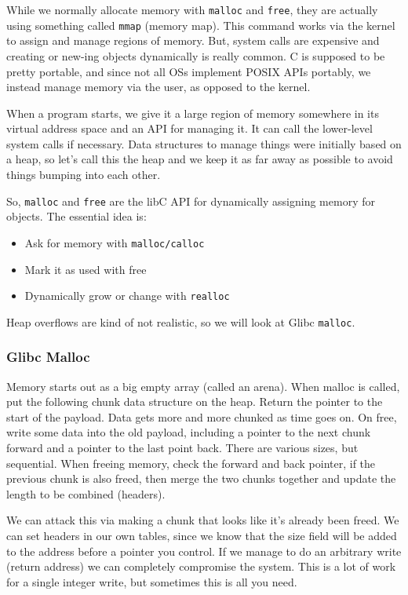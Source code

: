 \documentclass[11pt,a4paper,titlepage,dvipsnames,cmyk]{scrartcl}
\begin{document}
While we normally allocate memory with \texttt{malloc} and \texttt{free}, they are actually using something called \texttt{mmap} (memory map). This command works via the kernel to assign and manage regions of memory. But, system calls are expensive and creating or new-ing objects dynamically is really common. C is supposed to be pretty portable, and since not all OSs implement POSIX APIs portably, we instead manage memory via the user, as opposed to the kernel.

When a program starts, we give it a large region of memory somewhere in its virtual address space and an API for managing it. It can call the lower-level system calls if necessary. Data structures to manage things were initially based on a heap, so let's call this the heap and we keep it as far away as possible to avoid things bumping into each other.

So, \texttt{malloc} and \texttt{free} are the libC API for dynamically assigning memory for objects. The essential idea is:
\begin{itemize}
    \item Ask for memory with \texttt{malloc/calloc}
    \item Mark it as used with free
    \item Dynamically grow or change with \texttt{realloc}
\end{itemize}

Heap overflows are kind of not realistic, so we will look at Glibc \texttt{malloc}.

\subsubsection{Glibc Malloc}
Memory starts out as a big empty array (called an arena). When malloc is called, put the following chunk data structure on the heap. Return the pointer to the start of the payload. Data gets more and more chunked as time goes on. On free, write some data into the old payload, including a pointer to the next chunk forward and a pointer to the last point back. There are various sizes, but sequential. When freeing memory, check the forward and back pointer, if the previous chunk is also freed, then merge the two chunks together and update the length to be combined (headers).

We can attack this via making a chunk that looks like it's already been freed. We can set headers in our own tables, since we know that the size field will be added to the address before a pointer you control. If we manage to do an arbitrary write (return address) we can completely compromise the system. This is a lot of work for a single integer write, but sometimes this is all you need.
\end{document}
